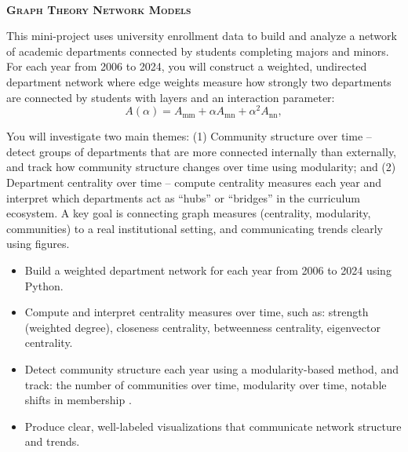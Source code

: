 \documentclass[article, 11pt]{article}
\begin{document}
\begin{center}
\\
\Huge{\textbf{\textsc{Graph Theory Network Models}}}\\
\end{center}

\vspace{.6cm}

\noindent {}

\vspace{-.35cm}
\noindent \hrulefill

This mini-project uses university enrollment data to build and analyze a network of academic departments connected by students completing majors and minors. For each year from 2006 to 2024, you will construct a weighted, undirected department network where edge weights measure how strongly two departments are connected by students with layers and an interaction parameter: 
\[
A(\alpha) = A_{\text{mm}} + \alpha A_{\text{mn}} + \alpha^2 A_{\text{nn}},
\] 

You will investigate two main themes: (1) Community structure over time -- detect groups of departments that are more connected internally than externally, and track how community structure changes over time using modularity; and (2) Department centrality over time -- compute centrality measures each year and interpret which departments act as ``hubs'' or ``bridges'' in the curriculum ecosystem. A key goal is connecting graph measures (centrality, modularity, communities) to a real institutional setting, and communicating trends clearly using figures.

\vspace{.35cm}


\noindent {}

\vspace{-.35cm}
\noindent \hrulefill

\begin{itemize}
\item Build a weighted department network for each year from 2006 to 2024 using Python.
\item Compute and interpret {centrality measures over time}, such as: strength (weighted degree), closeness centrality, betweenness centrality, eigenvector centrality. 
\item Detect {community structure} each year using a modularity-based method, and track: the number of communities over time, modularity over time, notable shifts in membership .
\item Produce clear, well-labeled visualizations that communicate network structure and trends.
\end{itemize}
\end{document}

